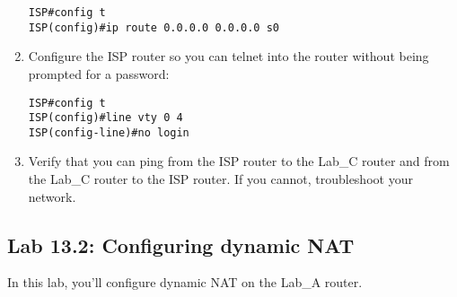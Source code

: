 \begin{enumerate}
\begin{verbatim}
ISP#config t
ISP(config)#ip route 0.0.0.0 0.0.0.0 s0
\end{verbatim}
\item
  Configure the ISP router so you can telnet into the router without
  being prompted for a password:

\begin{verbatim}
ISP#config t
ISP(config)#line vty 0 4
ISP(config-line)#no login
\end{verbatim}
\item
  Verify that you can ping from the ISP router to the Lab\_C router and
  from the Lab\_C router to the ISP router. If you cannot, troubleshoot
  your network.
\end{enumerate}




\subsection{Lab 13.2: Configuring dynamic NAT}

In this lab, you'll configure dynamic NAT on the Lab\_A router.

